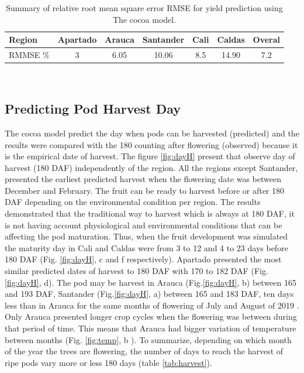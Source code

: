 \documentclass[gene,journal,article,submit,moreauthors,pdftex]{Definitions/mdpi}
\begin{document}
\begin{table}[h!]	
	\caption {\footnotesize {Summary of relative root mean square error RMSE for yield prediction using The cocoa model.}}
	\label{tab:error} 
	\centering
	\begin{small}
		\begin{tabular}{l c c c c c c}
			\hline
			{\bf Region }&{\bf Apartado }&{\bf Arauca}&{\bf Santander}&{\bf Cali}&{\bf Caldas}&{\bf Overal}\\
			\hline
			RMMSE \%  & 3 & 6.05 & 10.06&8.5&14.90&7.2 \\
			\hline
		\end{tabular} \\
	\end{small}
\end{table}
\newpage

\subsection{Predicting Pod Harvest Day }

{\color{olive} The cocoa model predict the day when pods can be harvested (predicted) and the results were compared with the 180 counting after flowering (observed) because it is the empirical date of harvest. The figure \ref{fig:dayH} present that observe day of harvest (180 DAF) independently of the region. All the regions except Santander, presented the earliest predicted harvest when the flowering date was between December and February. The fruit can be ready to harvest before or after 180 DAF depending on the environmental condition per region. The results demonstrated that the traditional way to harvest which is always at 180 DAF, it is not having account physiological and environmental conditions that can be affecting the pod maturation.} Thus, when the fruit development was simulated the maturity day in Cali and Caldas were from 3 to 12 and 4 to 23 days before 180 DAF (Fig. \ref{fig:dayH}, c and f respectively). Apartado presented the most similar predicted dates of harvest to 180 DAF with 170 to 182 DAF  (Fig. \ref{fig:dayH}, d). The pod may be harvest in Arauca (Fig.\ref{fig:dayH}, b)  between 165 and 193 DAF, Santander (Fig.\ref{fig:dayH}, a) between 165 and 183 DAF, ten days less than in Arauca for the same months of flowering of July and August of 2019 . Only Arauca presented longer crop cycles when the flowering was between during that period of time. This means that Arauca had bigger variation of temperature between months (Fig. \ref{fig:temp}, b ). {\color{olive} To summarize, depending on which month of the year the trees are flowering,  the number of days to reach the harvest of ripe pods vary more or less 180 days (table \ref{tab:harvest}).}
 
\end{document}
